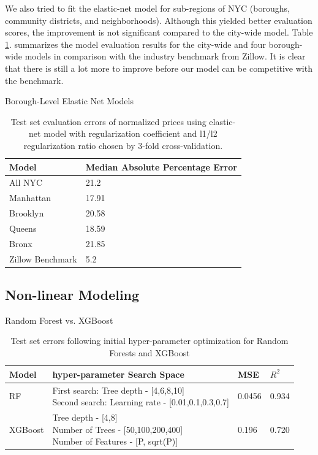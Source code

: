 \documentclass[journal]{IEEEtran}
\begin{document}
We also tried to fit the elastic-net model for sub-regions of NYC (boroughs, community districts, and neighborhoods). Although this yielded better evaluation scores, the improvement is not significant compared to the city-wide model. Table \ref{tab:elastic_net}. summarizes the model evaluation results for the city-wide and four borough-wide models in comparison with the industry benchmark from Zillow. It is clear that there is still a lot more to improve before our model can be competitive with the benchmark.

\begin{table}[h!]
    \caption*{Borough-Level Elastic Net Models}
    \centering
    \begin{tabular}{ | l | l | }
    \hline
    Model & Median Absolute Percentage Error  \\ \hline
    All NYC & 21.2   \\ \hline
    Manhattan & 17.91  \\ \hline
    Brooklyn & 20.58   \\ \hline
    Queens & 18.59  \\ \hline
    Bronx & 21.85   \\ \hline
    Zillow Benchmark & 5.2   \\ \hline 
    \end{tabular}
    \caption{Test set evaluation errors of normalized prices using elastic-net model with regularization coefficient and l1/l2 regularization ratio chosen by 3-fold cross-validation.}
    \label{tab:elastic_net} 
\end{table}

\subsection{Non-linear Modeling}
\begin{table}[h!]
    \caption*{Random Forest vs. XGBoost}
    \centering
    \begin{tabular}{ | l | l | l | l | }
    \hline
    Model & hyper-parameter Search Space & MSE & $R^2$  \\ \hline
    RF & \pbox{10cm}{First search: Tree depth - [4,6,8,10] \\Second search: Learning rate - [0.01,0.1,0.3,0.7]} & 0.0456 & 0.934 \\ \hline
    XGBoost & \pbox{10cm}{Tree depth - [4,8] \\ Number of Trees - [50,100,200,400]\\Number of Features - [P, sqrt(P)]} & 0.196 & 0.720 \\ \hline
    \end{tabular}
    \caption{Test set errors following initial hyper-parameter optimization for Random Forests and XGBoost} \label{tab:errors_rf_XGBoost} 
\end{table}
\end{document}
